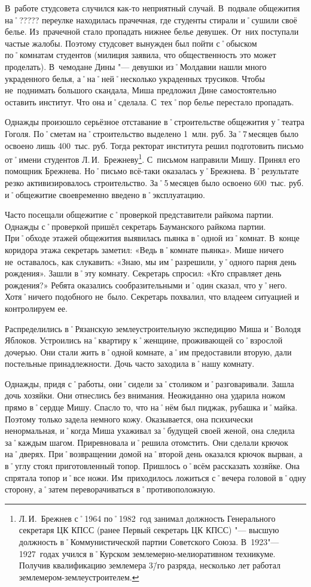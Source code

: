 В~работе студсовета случился как-то неприятный случай. В~подвале общежития на˚????? переулке находилась прачечная, где студенты стирали и˚сушили своё белье. Из~прачечной стало пропадать нижнее белье девушек. От~них поступали частые жалобы. Поэтому студсовет вынужден был пойти с˚обыском по˚комнатам студентов (милиция заявила, что общественность это может проделать). В~чемодане Дины "--- девушки из˚Молдавии нашли много украденного белья, а˚на˚ней˚несколько украденных трусиков. Чтобы не~поднимать большого скандала, Миша предложил Дине самостоятельно оставить институт. Что она и˚сделала. С~тех˚пор белье перестало пропадать.

Однажды произошло серьёзное отставание в˚строительстве общежития у˚театра Гоголя. По˚сметам на˚строительство выделено 1~млн. руб. За˚7\,месяцев было освоено лишь 400~тыс. руб. Тогда ректорат института решил подготовить письмо от˚имени студентов Л.\,И.~Брежневу\footnote{Л.\,И.~Брежнев с˚1964 по˚1982~год занимал должность Генерального секретаря ЦК КПСС (ранее Первый секретарь ЦК КПСС) "--- высшую должность в˚Коммунистической партии Советского Союза. В~1923"---1927~годах учился в˚Курском землемерно-мелиоративном техникуме. Получив квалификацию землемера 3\=/го разряда, несколько лет работал землемером-землеустроителем.}. С~письмом направили Мишу. Принял его помощник Брежнева. Но˚письмо всё-таки оказалась у˚Брежнева. В˚результате резко активизировалось строительство. За˚5\,месяцев было освоено 600~тыс. руб. и˚общежитие своевременно введено в˚эксплуатацию.

Часто посещали общежитие с˚проверкой представители райкома партии. Однажды с˚проверкой пришёл секретарь Бауманского райкома партии. При˚обходе этажей общежития выявилась пьянка в˚одной из˚комнат. В~конце коридора этажа секретарь заметил: «Ведь в˚комнате пьянка». Мише ничего не~оставалось, как слукавить: «Знаю, мы им˚разрешили, у˚одного парня день рождения». Зашли в˚эту комнату. Секретарь спросил: «Кто справляет день рождения?» Ребята оказались сообразительными и˚один сказал, что у˚него. Хотя˚ничего подобного не~было. Секретарь похвалил, что владеем ситуацией и контролируем ее.

Распределились в˚Рязанскую землеустроительную экспедицию Миша и˚Володя Яблоков. Устроились на˚квартиру к˚женщине, проживающей со˚взрослой дочерью. Они стали жить в˚одной комнате, а˚им предоставили вторую, дали постельные принадлежности. Дочь часто заходила в˚нашу комнату.

Однажды, придя с˚работы, они˚сидели за˚столиком и˚разговаривали. Зашла дочь хозяйки. Они отнеслись без внимания. Неожиданно она ударила ножом прямо в˚сердце Мишу. Спасло то, что на˚нём был пиджак, рубашка и˚майка. Поэтому только задела немного кожу. Оказывается, она психически ненормальная, и˚когда Миша ухаживал за˚будущей своей женой, она следила за˚каждым шагом. Приревновала и˚решила отомстить. Они сделали крючок на˚дверях. При˚возвращении домой на˚второй день оказался крючок вырван, а в˚углу стоял приготовленный топор. Пришлось о˚всём рассказать хозяйке. Она спрятала топор и˚все ножи. Им~приходилось ложиться с˚вечера головой в˚одну сторону, а˚затем переворачиваться в˚противоположную.

